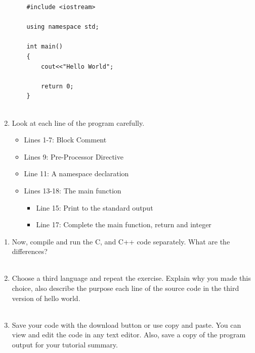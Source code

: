 \documentclass[12pt]{article}
\begin{document}
\begin{description}[labelindent=1cm]
\begin{enumerate}
\begin{lstlisting}
	#include <iostream>
	
	using namespace std;
	
	int main()
	{
		cout<<"Hello World";
		
		return 0;
	}
	
	\end{lstlisting}
	
	\item	
	Look at each line of the program carefully.
		\begin{itemize}
			\item Lines 1-7: Block Comment 
			\item Lines 9: Pre-Processor Directive
			\item Line 11: A namespace declaration
			\item Lines 13-18: The main function
			 \begin{itemize}
			 	\item Line 15: Print to the standard output
			 	\item Line 17: Complete the main function, return and integer 
		 	 \end{itemize}
		\end{itemize}
		
\end{enumerate}

\newpage
	\item[\textbf{\underline{Part 3 - Testing:}}] \hfill \vspace{0mm}
	\begin{enumerate}
	
		\item Now, compile and run the C, and C++ code separately. What are the differences? \\\\
		
		\item Choose a third language and repeat the exercise. Explain why you made this choice, also describe the purpose each line of the source code in the third version of hello world.\\\\
		
	
	
		\item Save your code with the download button or use copy and paste. You can view and edit the code in any text editor. Also, save a copy of the program output for your tutorial summary. \\\\


\end{enumerate}
\end{description}
\end{document}
